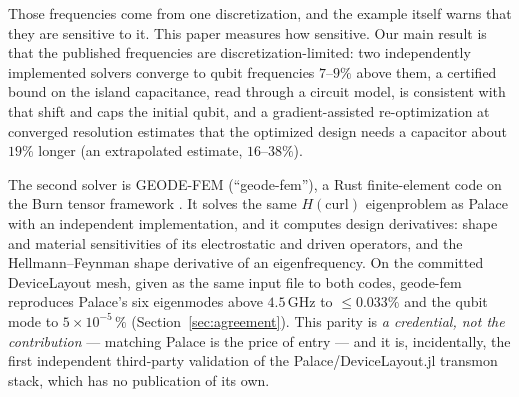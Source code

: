 \documentclass{anvil-paper}
\begin{document}
Those frequencies come from one discretization, and the example itself
warns that they are sensitive to it. This paper measures how sensitive.
Our main result is that the published frequencies are
discretization-limited: two independently implemented solvers converge to
qubit frequencies $7$--$9\%$ above them, a certified bound on the island
capacitance, read through a circuit model, is consistent with that shift
and caps the initial qubit, and a gradient-assisted re-optimization at
converged resolution estimates that the optimized design needs a capacitor
about $19\%$ longer (an extrapolated estimate, $16$--$38\%$).

The second solver is GEODE-FEM (``geode-fem''), a Rust finite-element code
on the Burn tensor framework \citep{burn}. It solves the same
$H(\mathrm{curl})$ eigenproblem as Palace with an independent
implementation, and it computes design derivatives: shape and material
sensitivities of its electrostatic and driven operators, and the
Hellmann--Feynman shape derivative of an eigenfrequency. On the
committed DeviceLayout mesh, given as the same input file to both codes,
geode-fem reproduces Palace's six eigenmodes above $4.5$\,GHz to
$\leq 0.033\%$ and the qubit mode to $5\times10^{-5}\,\%$
(Section~\ref{sec:agreement}).
This parity is \emph{a credential, not the contribution} --- matching Palace is the price of entry --- and it is, incidentally, the first independent third-party validation of the Palace/DeviceLayout.jl transmon stack, which has no publication of its own.
\end{document}

